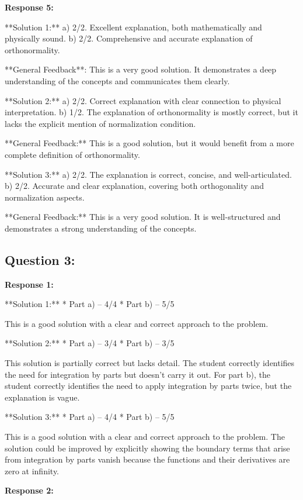 \documentclass[a4paper,11pt]{article}
\begin{document}
\bigskip    
\textbf{Response 5:}

**Solution 1:**
a) 2/2. Excellent explanation, both mathematically and physically sound.
b) 2/2. Comprehensive and accurate explanation of orthonormality.

**General Feedback**: This is a very good solution. It demonstrates a deep understanding of the concepts and communicates them clearly.

**Solution 2:**
a) 2/2. Correct explanation with clear connection to physical interpretation.
b) 1/2. The explanation of orthonormality is mostly correct, but it lacks the explicit mention of normalization condition.

**General Feedback:** This is a good solution, but it would benefit from a more complete definition of orthonormality.

**Solution 3:**
a) 2/2.  The explanation is correct, concise, and well-articulated.
b) 2/2.  Accurate and clear explanation, covering both orthogonality and normalization aspects.

**General Feedback:** This is a very good solution. It is well-structured and demonstrates a strong understanding of the concepts.

\subsection*{Question 3:}

\textbf{Response 1:}

**Solution 1:**
*   Part a) – 4/4
*   Part b) – 5/5

This is a good solution with a clear and correct approach to the problem.

**Solution 2:**
*   Part a) – 3/4
*   Part b) – 3/5

This solution is partially correct but lacks detail. The student correctly identifies the need for integration by parts but doesn't carry it out. For part b), the student correctly identifies the need to apply integration by parts twice, but the explanation is vague.

**Solution 3:**
*   Part a) – 4/4
*   Part b) – 5/5

This is a good solution with a clear and correct approach to the problem. The solution could be improved by explicitly showing the boundary terms that arise from integration by parts vanish because the functions and their derivatives are zero at infinity.

\bigskip    
\textbf{Response 2:}
\end{document}
